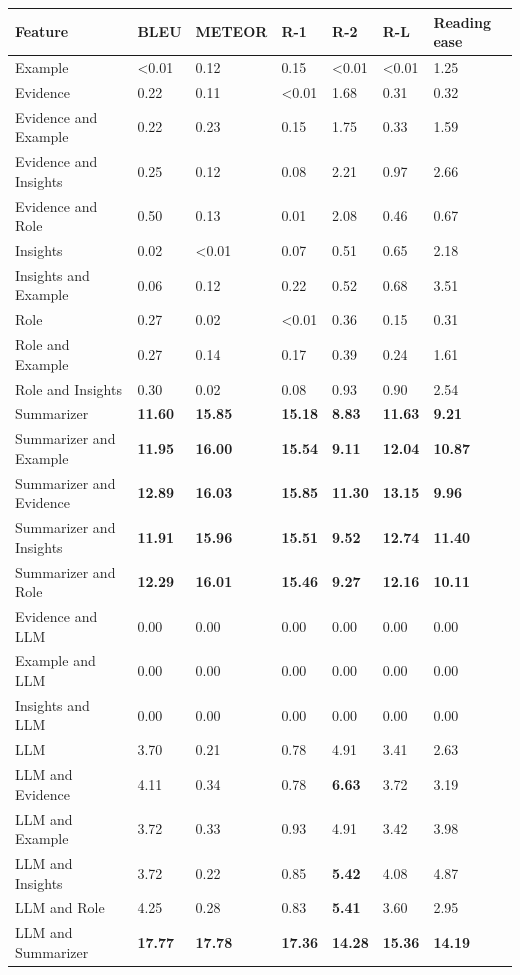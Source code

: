 \begin{tabular}{|l|l|l|l|l|l|l|}
\hline
\textbf{Feature} & BLEU & METEOR & R-1 & R-2 & R-L & Reading ease \\
 \hline
 Example & \textless{}0.01 & 0.12 & 0.15 & \textless{}0.01 & \textless{}0.01 & 1.25 \\
 \hline
 Evidence & 0.22 & 0.11 & \textless{}0.01 & 1.68 & 0.31 & 0.32 \\
 \hline
 Evidence and Example & 0.22 & 0.23 & 0.15 & 1.75 & 0.33 & 1.59 \\
 \hline
 Evidence and Insights & 0.25 & 0.12 & 0.08 & 2.21 & 0.97 & 2.66 \\
 \hline
 Evidence and Role & 0.50 & 0.13 & 0.01 & 2.08 & 0.46 & 0.67 \\
 \hline
 Insights & 0.02 & \textless{}0.01 & 0.07 & 0.51 & 0.65 & 2.18 \\
 \hline
 Insights and Example & 0.06 & 0.12 & 0.22 & 0.52 & 0.68 & 3.51 \\
 \hline
 Role & 0.27 & 0.02 & \textless{}0.01 & 0.36 & 0.15 & 0.31 \\
 \hline
 Role and Example & 0.27 & 0.14 & 0.17 & 0.39 & 0.24 & 1.61 \\
 \hline
 Role and Insights & 0.30 & 0.02 & 0.08 & 0.93 & 0.90 & 2.54 \\
 \hline
 Summarizer & \textbf{11.60} & \textbf{15.85} & \textbf{15.18} & \textbf{8.83} & \textbf{11.63} & \textbf{9.21} \\
 \hline
 Summarizer and Example & \textbf{11.95} & \textbf{16.00} & \textbf{15.54} & \textbf{9.11} & \textbf{12.04} & \textbf{10.87} \\
 \hline
 Summarizer and Evidence & \textbf{12.89} & \textbf{16.03} & \textbf{15.85} & \textbf{11.30} & \textbf{13.15} & \textbf{9.96} \\
 \hline
 Summarizer and Insights & \textbf{11.91} & \textbf{15.96} & \textbf{15.51} & \textbf{9.52} & \textbf{12.74} & \textbf{11.40} \\
 \hline
 Summarizer and Role & \textbf{12.29} & \textbf{16.01} & \textbf{15.46} & \textbf{9.27} & \textbf{12.16} & \textbf{10.11} \\
 \hline
 Evidence and LLM & 0.00 & 0.00 & 0.00 & 0.00 & 0.00 & 0.00 \\
 \hline
 Example and LLM & 0.00 & 0.00 & 0.00 & 0.00 & 0.00 & 0.00 \\
 \hline
 Insights and LLM & 0.00 & 0.00 & 0.00 & 0.00 & 0.00 & 0.00 \\
 \hline
 LLM & 3.70 & 0.21 & 0.78 & 4.91 & 3.41 & 2.63 \\
 \hline
 LLM and Evidence & 4.11 & 0.34 & 0.78 & \textbf{6.63} & 3.72 & 3.19 \\
 \hline
 LLM and Example & 3.72 & 0.33 & 0.93 & 4.91 & 3.42 & 3.98 \\
 \hline
 LLM and Insights & 3.72 & 0.22 & 0.85 & \textbf{5.42} & 4.08 & 4.87 \\
 \hline
 LLM and Role & 4.25 & 0.28 & 0.83 & \textbf{5.41} & 3.60 & 2.95 \\
 \hline
 LLM and Summarizer & \textbf{17.77} & \textbf{17.78} & \textbf{17.36} & \textbf{14.28} & \textbf{15.36} & \textbf{14.19} \\
\hline
\end{tabular}
